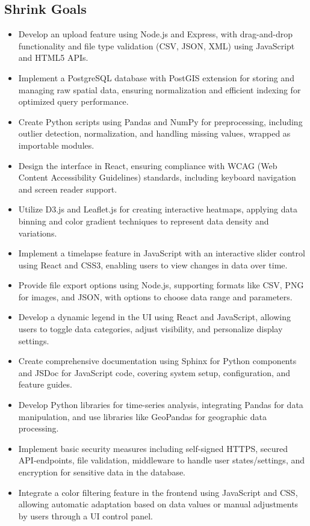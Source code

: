 \documentclass[12pt]{article}
\begin{document}
\subsection*{Shrink Goals}
\begin{itemize}
    \item  Develop an upload feature using Node.js and Express, with drag-and-drop functionality and file type validation (CSV, JSON, XML) using JavaScript and HTML5 APIs.
    \item Implement a PostgreSQL database with PostGIS extension for storing and managing raw spatial data, ensuring normalization and efficient indexing for optimized query performance.
    \item Create Python scripts using Pandas and NumPy for preprocessing, including outlier detection, normalization, and handling missing values, wrapped as importable modules.
    \item Design the interface in React, ensuring compliance with WCAG (Web Content Accessibility Guidelines) standards, including keyboard navigation and screen reader support.
    \item Utilize D3.js and Leaflet.js for creating interactive heatmaps, applying data binning and color gradient techniques to represent data density and variations.
    \item Implement a timelapse feature in JavaScript with an interactive slider control using React and CSS3, enabling users to view changes in data over time.
    \item Provide file export options using Node.js, supporting formats like CSV, PNG for images, and JSON, with options to choose data range and parameters.
    \item Develop a dynamic legend in the UI using React and JavaScript, allowing users to toggle data categories, adjust visibility, and personalize display settings.
    \item Create comprehensive documentation using Sphinx for Python components and JSDoc for JavaScript code, covering system setup, configuration, and feature guides.
    \item Develop Python libraries for time-series analysis, integrating Pandas for data manipulation, and use libraries like GeoPandas for geographic data processing.
    \item Implement basic security measures including self-signed HTTPS, secured API-endpoints, file validation, middleware to handle user states/settings, and encryption for sensitive data in the database.
    \item Integrate a color filtering feature in the frontend using JavaScript and CSS, allowing automatic adaptation based on data values or manual adjustments by users through a UI control panel.
\end{itemize}
\end{document}
